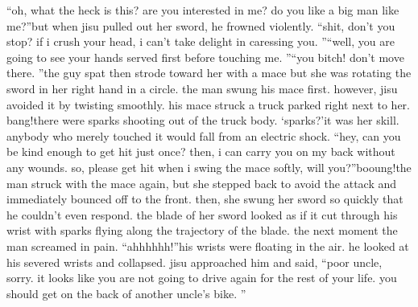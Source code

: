 “oh, what the heck is this? are you interested in me? do you like a big man like me?”but when jisu pulled out her sword, he frowned violently.
“shit, don’t you stop? if i crush your head, i can’t take delight in caressing you.
”“well, you are going to see your hands served first before touching me.
”“you bitch! don’t move there.
”the guy spat then strode toward her with a mace but she was rotating the sword in her right hand in a circle.
the man swung his mace first.
 however, jisu avoided it by twisting smoothly.
 his mace struck a truck parked right next to her.
bang!there were sparks shooting out of the truck body.
‘sparks?’it was her skill.
 anybody who merely touched it would fall from an electric shock.
“hey, can you be kind enough to get hit just once? then, i can carry you on my back without any wounds.
 so, please get hit when i swing the mace softly, will you?”booung!the man struck with the mace again, but she stepped back to avoid the attack and immediately bounced off to the front.
 then, she swung her sword so quickly that he couldn’t even respond.
the blade of her sword looked as if it cut through his wrist with sparks flying along the trajectory of the blade.
the next moment the man screamed in pain.
“ahhhhhh!”his wrists were floating in the air.
 he looked at his severed wrists and collapsed.
jisu approached him and said, “poor uncle, sorry.
 it looks like you are not going to drive again for the rest of your life.
 you should get on the back of another uncle’s bike.
”

 